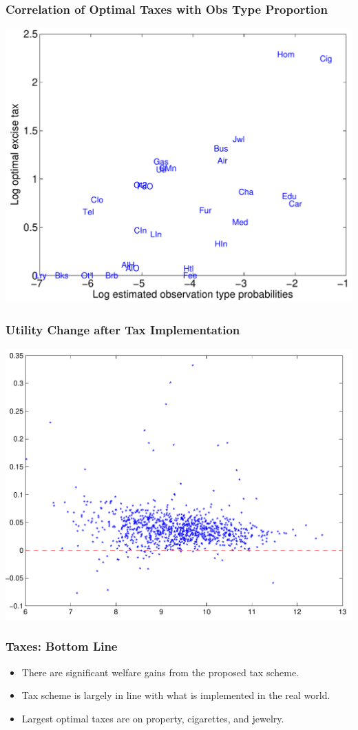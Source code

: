\documentclass{beamer}
\begin{document}
  \begin{frame}
    \frametitle{Correlation of Optimal Taxes with Obs Type Proportion}
    \includegraphics[scale=.55]{pics/tvscat_cropped.pdf} 
  \end{frame}
  \begin{frame}
    \frametitle{Utility Change after Tax Implementation}
    \includegraphics[scale=.55]{pics/taxscat_cropped.pdf} 
  \end{frame}
  \begin{frame}
    \frametitle{Taxes: Bottom Line}
    \begin{itemize}
      \item There are significant welfare gains from the proposed tax scheme.
      \item Tax scheme is largely in line with what is implemented in the real world.
      \item Largest optimal taxes are on property, cigarettes, and jewelry.
    \end{itemize}
    \end{frame}
\end{document}
